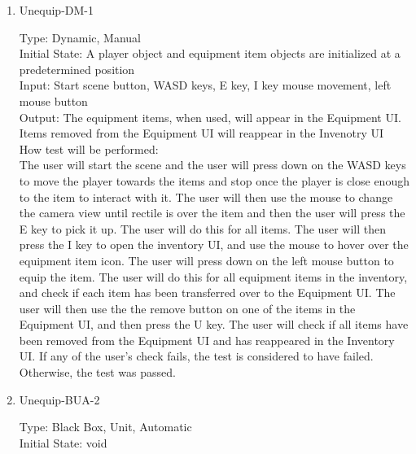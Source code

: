 \documentclass[12pt, titlepage]{article}
\newcounter{ftnum}
\begin{document}
\begin{enumerate}

\item{{\color{magenta} Unequip-DM-1}}  \label{F12-1}

{\color{magenta} Type: Dynamic, Manual} \\
					
{\color{magenta} Initial State: A player object and equipment item objects are initialized at a predetermined position}\\
					
{\color{magenta} Input: Start scene button, WASD keys, E key, I key mouse movement, left mouse button}\\
					
{\color{magenta} Output: The equipment items, when used, will appear in the Equipment UI. Items removed from the Equipment UI will reappear in the Invenotry UI}\\
					
{\color{magenta}How test will be performed:}\\ {\color{magenta} The user will start the scene and the user will press down on the WASD keys to move the player towards the items and stop once the player is close enough to the item to interact with it. The user will then use the mouse to change the camera view until rectile is over the item and then the user will press the E key to pick it up. The user will do this for all items. The user will then press the I key to open the inventory UI, and use the mouse to hover over the equipment item icon. The user will press down on the left mouse button to equip the item. The user will do this for all equipment items in the inventory, and check if each item has been transferred over to the Equipment UI. The user will then use the  the remove button on one of the items in the Equipment UI, and then press the U key. The user will check if all items have been removed from the Equipment UI and has reappeared in the Inventory UI. If any of the user's check fails, the test is considered to have failed. Otherwise, the test was passed.}

\item{{\color{magenta} Unequip-BUA-2}\\}  \label{F12-2}

{\color{magenta} Type: Black Box, Unit, Automatic}\\
					
{\color{magenta} Initial State: void}\\
					

\end{enumerate}
\end{document}
